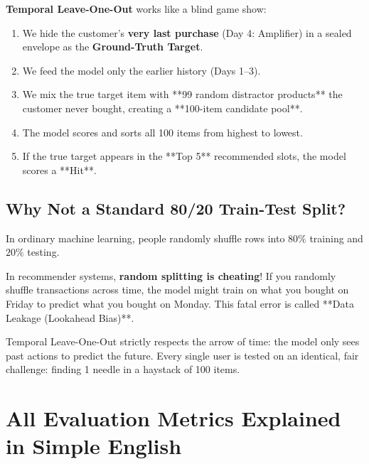 \documentclass[11pt,a4paper]{article}
\begin{document}
\textbf{Temporal Leave-One-Out} works like a blind game show:
\begin{enumerate}
    \item We hide the customer's \textbf{very last purchase} (Day 4: Amplifier) in a sealed envelope as the \textbf{Ground-Truth Target}.
    \item We feed the model only the earlier history (Days 1--3).
    \item We mix the true target item with **99 random distractor products** the customer never bought, creating a **100-item candidate pool**.
    \item The model scores and sorts all 100 items from highest to lowest.
    \item If the true target appears in the **Top 5** recommended slots, the model scores a **Hit**.
\end{enumerate}

\subsection{Why Not a Standard 80/20 Train-Test Split?}
In ordinary machine learning, people randomly shuffle rows into $80\%$ training and $20\%$ testing. 

In recommender systems, \textbf{random splitting is cheating}! If you randomly shuffle transactions across time, the model might train on what you bought on Friday to predict what you bought on Monday. This fatal error is called **Data Leakage (Lookahead Bias)**. 

\begin{tcolorbox}[title=Why Temporal LOO is the Academic Gold Standard]
Temporal Leave-One-Out strictly respects the arrow of time: the model only sees past actions to predict the future. Every single user is tested on an identical, fair challenge: finding 1 needle in a haystack of 100 items.
\end{tcolorbox}

\section{All Evaluation Metrics Explained in Simple English}
\end{document}
